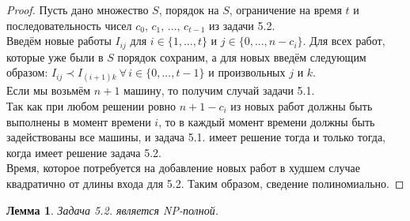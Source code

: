 \documentclass[a4paper,12pt]{article}
\theoremstyle{plain} %
\newtheorem{lemma}{Лемма}[section]
\theoremstyle{definition} %
\theoremstyle{remark} %
\begin{document}
\begin{proof}
	Пусть дано множество $S$, порядок на $S$, ограничение на время $t$ и последовательность чисел $c_0, \, c_1, \,..., \, c_{t - 1}$ из задачи 5.2.\\
	Введём новые работы $I_{ij}$ для $i \in \{1, ..., t\}$ и $j \in \{0, ..., n - c_i\}$. Для всех работ, которые уже были в $S$ порядок сохраним, а для новых введём следующим образом: $I_{ij} \prec I_{(i + 1)k} \: \forall \, i \in \{0, ..., t - 1\}$ и произвольных $j$ и $k$.\\
	Если мы возьмём $n + 1$ машину, то получим случай задачи 5.1.\\
	Так как при любом решении ровно $n + 1 - c_i$ из новых работ должны быть выполнены в момент времени $i$, то в каждый момент времени должны быть задействованы все машины, и задача 5.1. имеет решение тогда и только тогда, когда имеет решение задача 5.2.\\
	Время, которое потребуется на добавление новых работ в худшем случае квадратично от длины входа для 5.2. Таким образом, сведение полиномиально.
\end{proof}

\par\bigskip

\begin{lemma}
	Задача 5.2. является NP-полной.
\end{lemma}
\end{document}
